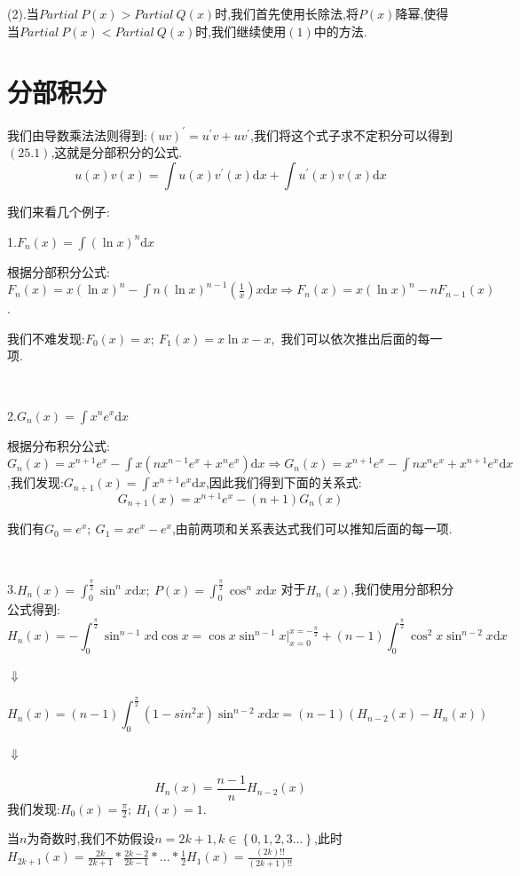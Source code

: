 \documentclass[oneside]{book}
\begin{document}
	(2).当$Partial\ P(x)>Partial\ Q(x)$时,我们首先使用长除法,将$P(x)$降幂,使得当$Partial\ P(x)<Partial\ Q(x)$时,我们继续使用$(1)$中的方法.
	
	\chapter{分部积分}
	我们由导数乘法法则得到:$(uv)^{'}=u^{'}v+uv^{'} $,我们将这个式子求不定积分可以得到$(25.1)$,这就是分部积分的公式.\begin{equation}
	u(x)v(x)=\int u(x)v^{'}(x)\mathrm{d}x+\int u^{'}(x)v(x)\mathrm{d}x\end{equation}
	
	
	
	我们来看几个例子:
	
	1.$F_{n}(x)=\int (\ln x)^{n}\mathrm{d}x$
	
	根据分部积分公式:$F_{n}(x)=x(\ln x)^{n}-\int n(\ln x)^{n-1}(\frac{1}{x})x\mathrm{d}x\Rightarrow F_{n}(x)=x(\ln x)^{n}-nF_{n-1}(x)$.
	
	我们不难发现:$F_{0}(x)=x;\ F_{1}(x)=x\ln x-x$,\ 我们可以依次推出后面的每一项.
	
	\hspace{\fill}\
	
	2.$G_{n}(x)=\int x^{n}e^{x}\mathrm{d}x$
	
	根据分布积分公式:$G_{n}(x)=x^{n+1}e^{x}-\int x( nx^{n-1}e^{x}+x^{n}e^{x})\mathrm{d}x\Rightarrow G_{n}(x)=x^{n+1}e^{x}-\int nx^{n}e^{x}+x^{n+1}e^{x}\mathrm{d}x$,我们发现:$G_{n+1}(x)=\int x^{n+1}e^{x}\mathrm{d}x$,因此我们得到下面的关系式:
	$$G_{n+1}(x)=x^{n+1}e^{x}-(n+1)G_{n}(x)$$
	
	我们有$G_{0}=e^{x};\ G_{1}=xe^{x}-e^{x}$,由前两项和关系表达式我们可以推知后面的每一项.
	
	\hspace{\fill}\
	
	3.$H_{n}(x)=\int_{0}^{\frac{\pi}{2}}\sin^{n} x\mathrm{d}x;\ P(x)=\int_{0}^{\frac{\pi}{2}}\cos^{n}x\mathrm{d}x$
	对于$H_{n}(x)$,我们使用分部积分公式得到:$$H_{n}(x)=-\int_{0}^{\frac{\pi}{2}}\sin^{n-1}x\mathrm{d}\cos x=\cos x\sin^{n-1}x\big|_{x=0}^{x=-\frac{\pi}{2}}+(n-1)\int_{0}^{\frac{\pi}{2}}\cos^{2}x\sin^{n-2}x\mathrm{d}x$$
	\centerline{$\Downarrow$}
	$$ H_{n}(x)=(n-1)\int_{0}^{\frac{\pi}{2}}
	(1-sin^{2}x)\sin^{n-2}x\mathrm{d}x=(n-1)(H_{n-2}(x)-H_{n}(x))$$
	\centerline{$\Downarrow$}
	$$H_{n}(x)=\frac{n-1}{n}H_{n-2}(x)$$
	我们发现:$H_{0}(x)=\frac{\pi}{2};\ H_{1}(x)=1$.
	
	当$n$为奇数时,我们不妨假设$n=2k+1,k\in\left\lbrace0,1,2,3...\right\rbrace $,此时$H_{2k+1}(x)=\frac{2k}{2k+1}*\frac{2k-2}{2k-1}*...*\frac{1}{2}H_{1}(x)=\frac{(2k)!!}{(2k+1)!!}$
	
\end{document}
